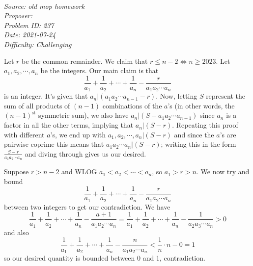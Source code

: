 \SSbreak\\
\emph{Source: old mop homework}\\
\emph{Proposer: \Paiya}\\ %
\emph{Problem ID: 237}\\
\emph{Date: 2021-07-24}\\
\emph{Difficulty: Challenging}\\
\SSbreak

\bigskip

\begin{solution}\hfil\medskip
  
    Let $r$ be the common remainder. We claim that $r \leq n - 2 \iff n \geq \boxed{2023}.$ 
    Let $a_1, a_2, \cdots , a_n$ be the integers. Our main claim is that 
    $$\dfrac{1}{a_1} + \dfrac{1}{a_2} + \cdots + \dfrac{1}{a_n} - \dfrac{r}{a_1a_2 \cdots a_n}$$
    is an integer. It's given that $a_n | \left(a_1a_2 \cdots a_{n-1} - r\right)$. Now, 
    letting $S$ represent the sum of all products of $(n-1)$ combinations of the $a$'s 
    (in other words, the $(n-1)^\text{st}$ symmetric sum), we also have 
    $a_n | \left(S - a_1a_2 \cdots a_{n-1}\right)$ since $a_n$ is a factor in all the 
    other terms, implying that $a_n | (S - r)$. Repeating this proof with different $a$'s, 
    we end up with $a_1, a_2, \cdots , a_n | (S - r)$ and since the $a$'s are pairwise coprime 
    this means that $a_1a_2 \cdots a_n | (S - r)$; writing this in the form $\frac{S - r}{a_1a_2 \cdots a_n}$
    and diving through gives us our desired. \medskip

    Suppose $r > n - 2$ and WLOG $a_1 < a_2 < \cdots < a_n$, so $a_1 > r > n$. 
    We now try and bound $$\dfrac{1}{a_1} + \dfrac{1}{a_2} + \cdots + \dfrac{1}{a_n} - \dfrac{r}{a_1a_2 \cdots a_n}$$ 
    between two integers to get our contradiction. We have 
    $$\dfrac{1}{a_1} + \dfrac{1}{a_2} + \cdots + \dfrac{1}{a_n} - \dfrac{a+1}{a_1a_2 \cdots a_n} = \dfrac{1}{a_1} + \dfrac{1}{a_2} + \cdots + \dfrac{1}{a_n} - \dfrac{1}{a_2a_3 \cdots a_n} > 0$$
    and also $$\dfrac{1}{a_1} + \dfrac{1}{a_2} + \cdots + \dfrac{1}{a_n} - \dfrac{n}{a_1a_2 \cdots a_n} < \dfrac{1}{n} \cdot n - 0 = 1$$
    so our desired quantity is bounded between 0 and 1, contradiction.

\end{solution}\bigskip
